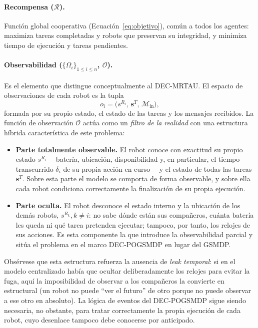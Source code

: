 \paragraph{Recompensa ($\mathcal{R}$).} Función global cooperativa (Ecuación~\eqref{eq:objetivo}), común a todos los agentes: maximiza tareas completadas y robots que preservan su integridad, y minimiza tiempo de ejecución y tareas pendientes.
 
\paragraph{Observabilidad ($\{\Omega_i\}_{1 \leq i \leq n}$, $\mathcal{O}$).} Es el elemento que distingue conceptualmente al DEC-MRTAU. El espacio de observaciones de cada robot es la tupla \begin{equation} \label{eq:observacion} o_i=\big(s^{R_i},\,\mathbf{s}^{T},\,\mathcal{M}_{\mathrm{in}}\big), \end{equation} formada por su propio estado, el estado de las tareas y los mensajes recibidos. La función de observación $\mathcal{O}$ actúa como un \emph{filtro de la realidad} con una estructura híbrida característica de este problema: 
\begin{itemize}   
    \item \textbf{Parte totalmente observable.} El robot conoce con exactitud su propio estado $s^{R_i}$ ---batería, ubicación, disponibilidad y, en particular, el tiempo transcurrido $\delta_i$ de su propia acción en curso--- y el estado de todas las tareas $\mathbf{s}^{T}$. Sobre esta parte el modelo se comporta de forma observable, y sobre ella cada robot condiciona correctamente la finalización de su propia ejecución.   
    \item \textbf{Parte oculta.} El robot desconoce el estado interno y la ubicación de los demás robots, $s^{R_{k}}, k \neq i$: no sabe dónde están sus compañeros, cuánta batería les queda ni qué tarea pretenden ejecutar; tampoco, por tanto, los relojes de sus acciones. Es esta componente la que introduce la observabilidad parcial y sitúa el problema en el marco DEC-POGSMDP en lugar del GSMDP. 
\end{itemize}
Obsérvese que esta estructura refuerza la ausencia de \emph{leak temporal}: si en el modelo centralizado había que ocultar deliberadamente los relojes para evitar la fuga, aquí la imposibilidad de observar a los compañeros la convierte en estructural (un robot no puede ``ver el futuro'' de otro porque no puede observar a ese otro en absoluto). La lógica de eventos del DEC-POGSMDP sigue siendo necesaria, no obstante, para tratar correctamente la propia ejecución de cada robot, cuyo desenlace tampoco debe conocerse por anticipado.
 
